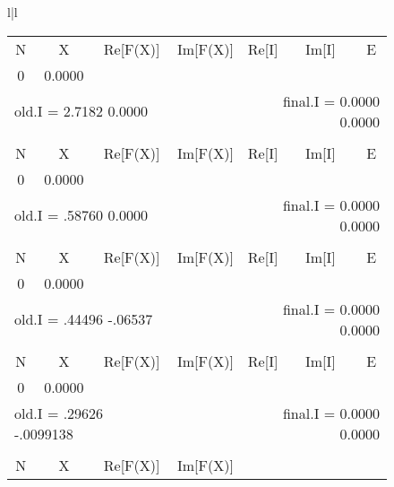 \begin{figure}
    \tiny
    \setlength{\tabcolsep}{.2em}
    \begin{tabular}{l|l}

        \begin{tabular}{cccllll}
            \multicolumn{1}{c}{N}        & \multicolumn{1}{c}{X} &           \multicolumn{1}{c}{Re[F(X)]} & \multicolumn{1}{l}{Im[F(X)]} & 
            \multicolumn{1}{l}{Re[I]}    & \multicolumn{1}{l}{Im[I]} &
            \multicolumn{1}{c}{E} \\
            0 & 0.0000 & & & & & \\
            \multicolumn{3}{l}{old.I = 2.7182 0.0000} & &
            \multicolumn{3}{r}{final.I = 0.0000 0.0000} \\
        \\
            \multicolumn{1}{c}{N}        & \multicolumn{1}{c}{X} &           \multicolumn{1}{c}{Re[F(X)]} & \multicolumn{1}{l}{Im[F(X)]} & 
            \multicolumn{1}{l}{Re[I]}    & \multicolumn{1}{l}{Im[I]} &
            \multicolumn{1}{c}{E} \\
            0 & 0.0000 & & & & & \\
            \multicolumn{3}{l}{old.I = .58760 0.0000} & &
            \multicolumn{3}{r}{final.I = 0.0000 0.0000} \\
        \\
            \multicolumn{1}{c}{N}        & \multicolumn{1}{c}{X} &           \multicolumn{1}{c}{Re[F(X)]} & \multicolumn{1}{l}{Im[F(X)]} & 
            \multicolumn{1}{l}{Re[I]}    & \multicolumn{1}{l}{Im[I]} &
            \multicolumn{1}{c}{E} \\
            0 & 0.0000 & & & & & \\
            \multicolumn{3}{l}{old.I = .44496 -.06537} & &
            \multicolumn{3}{r}{final.I = 0.0000 0.0000} \\
        \\
            \multicolumn{1}{c}{N}        & \multicolumn{1}{c}{X} &           \multicolumn{1}{c}{Re[F(X)]} & \multicolumn{1}{l}{Im[F(X)]} & 
            \multicolumn{1}{l}{Re[I]}    & \multicolumn{1}{l}{Im[I]} &
            \multicolumn{1}{c}{E} \\
            0 & 0.0000 & & & & & \\
            \multicolumn{3}{l}{old.I = .29626 -.0099138} & &
            \multicolumn{3}{r}{final.I = 0.0000 0.0000} \\
        \\
            \multicolumn{1}{c}{N}        & \multicolumn{1}{c}{X} &           \multicolumn{1}{c}{Re[F(X)]} & \multicolumn{1}{l}{Im[F(X)]} & 

\end{tabular}
\end{tabular}
\end{figure}
